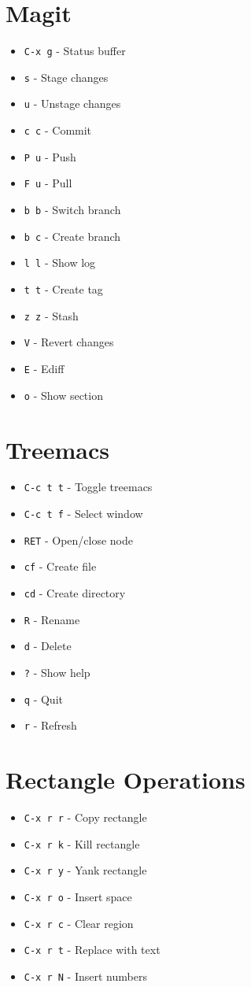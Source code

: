 \documentclass[6pt,landscape]{article}
\newcommand{\key}[1]{\texttt{#1}}
\begin{document}
\begin{multicols*}{5}
\section*{Magit}
\begin{itemize}[leftmargin=*,itemsep=0pt,parsep=0pt,topsep=0pt]
\item \key{C-x g} - Status buffer
\item \key{s} - Stage changes
\item \key{u} - Unstage changes
\item \key{c c} - Commit
\item \key{P u} - Push
\item \key{F u} - Pull
\item \key{b b} - Switch branch
\item \key{b c} - Create branch
\item \key{l l} - Show log
\item \key{t t} - Create tag
\item \key{z z} - Stash
\item \key{V} - Revert changes
\item \key{E} - Ediff
\item \key{o} - Show section
\end{itemize}

\section*{Treemacs}
\begin{itemize}[leftmargin=*,itemsep=0pt,parsep=0pt,topsep=0pt]
\item \key{C-c t t} - Toggle treemacs
\item \key{C-c t f} - Select window
\item \key{RET} - Open/close node
\item \key{cf} - Create file
\item \key{cd} - Create directory
\item \key{R} - Rename
\item \key{d} - Delete
\item \key{?} - Show help
\item \key{q} - Quit
\item \key{r} - Refresh
\end{itemize}

\section*{Rectangle Operations}
\begin{itemize}[leftmargin=*,itemsep=0pt,parsep=0pt,topsep=0pt]
\item \key{C-x r r} - Copy rectangle
\item \key{C-x r k} - Kill rectangle
\item \key{C-x r y} - Yank rectangle
\item \key{C-x r o} - Insert space
\item \key{C-x r c} - Clear region
\item \key{C-x r t} - Replace with text
\item \key{C-x r N} - Insert numbers
\end{itemize}


\end{multicols*}
\end{document}
